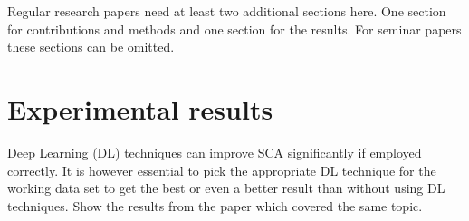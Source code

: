 \documentclass[journal]{IEEEtran}
\begin{document}
Regular research papers need at least two additional sections here. One section
for contributions and methods and one section for the results. For seminar
papers these sections can be omitted. 

\section{Experimental results}
Deep Learning (DL) techniques can improve SCA significantly if employed correctly. It is however essential to pick the appropriate DL technique for the working data set to get the best or even a better result than without using DL techniques.
Show the results from the paper which covered the same topic.

%
%

%
%
\end{document}
